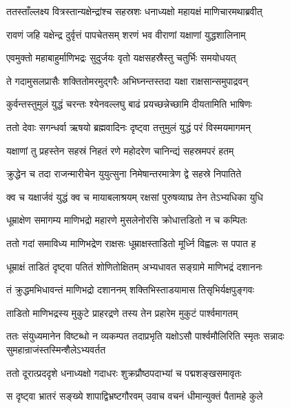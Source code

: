 
\twolineshloka
{ततस्ताँल्लक्ष्य वित्रस्तान्यक्षेन्द्रांश्च सहस्रशः}
{धनाध्यक्षो महायक्षं माणिचारमथाब्रवीत्} %

\twolineshloka
{रावणं जहि यक्षेन्द्र दुर्वृत्तं पापचेतसम्}
{शरणं भव वीराणां यक्षाणां युद्धशालिनाम्} %

\twolineshloka
{एवमुक्तो महाबाहुर्माणिभद्रः सुदुर्जयः}
{वृतो यक्षसहस्रैस्तु चतुर्भिः समयोधयत्} %

\twolineshloka
{ते गदामुसलप्रासैः शक्तितोमरमुद्गरैः}
{अभिघ्नन्तस्तदा यक्षा राक्षसान्समुपाद्रवन्} %

\twolineshloka
{कुर्वन्तस्तुमुलं युद्धं चरन्तः श्येनवल्लघु}
{बाढं प्रयच्छन्नेच्छामि दीयतामिति भाषिणः} %

\twolineshloka
{ततो देवाः सगन्धर्वा ऋषयो ब्रह्मवादिनः}
{दृष्ट्वा तत्तुमुलं युद्धं परं विस्मयमागमन्} %

\twolineshloka
{यक्षाणां तु प्रहस्तेन सहस्रं निहतं रणे}
{महोदरेण चानिन्द्यं सहस्रमपरं हतम्} %

\twolineshloka
{क्रुद्धेन च तदा राजन्मारीचेन युयुत्सुना}
{निमेषान्तरमात्रेण द्वे सहस्रे निपातिते} %

\twolineshloka
{क्व च यक्षार्जवं युद्धं क्व च मायाबलाश्रयम्}
{रक्षसां पुरुषव्याघ्र तेन तेऽभ्यधिका युधि} %

\twolineshloka
{धूम्राक्षेण समागम्य माणिभद्रो महारणे}
{मुसलेनोरसि क्रोधात्तडितो न च कम्पितः} %

\twolineshloka
{ततो गदां समाविध्य माणिभद्रेण राक्षसः}
{धूम्राक्षस्ताडितो मूर्ध्नि विह्वलः स पपात ह} %

\twolineshloka
{धूम्राक्षं ताडितं दृष्ट्वा पतितं शोणितोक्षितम्}
{अभ्यधावत सङ्ग्रामे माणिभद्रं दशाननः} %

\twolineshloka
{तं क्रुद्धमभिधावन्तं माणिभद्रो दशाननम्}
{शक्तिभिस्ताडयामास तिसृभिर्यक्षपुङ्गवः} %

\twolineshloka
{ताडितो माणिभद्रस्य मुकुटे प्राहरद्रणे}
{तस्य तेन प्रहारेम मुकुटं पार्श्वमागतम्} %

\threelineshloka
{ततः संयुध्यमानेन विष्टब्धो न व्यकम्पत}
{तदाप्रभृति यक्षोऽसौ पार्श्वमौलिरिति स्मृतः}
{सन्नादः सुमहान्राजंस्तस्मिन्शैलेऽभ्यवर्तत} %

\twolineshloka
{ततो दूरात्प्रददृशे धनाध्यक्षो गदाधरः}
{शुक्रप्रौष्ठपदाभ्यां च पद्मशङ्खसमावृतः} %

\twolineshloka
{स दृष्ट्वा भ्रातरं सङ्ख्ये शापाद्विभ्रष्टगौरवम्}
{उवाच वचनं धीमान्युक्तं पैतामहे कुले} %

